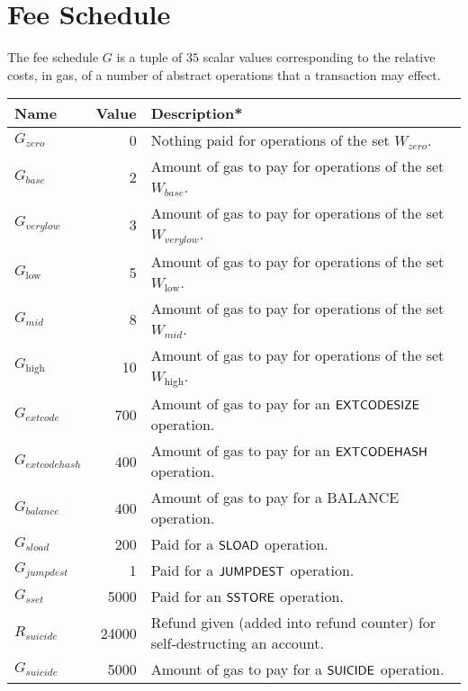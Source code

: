 

\section{Fee Schedule}\label{app:fees}

The fee schedule $G$ is a tuple of $35$ scalar values corresponding to the relative costs, in gas, of a number of abstract operations that a transaction may effect.

\begin{center}
	\begin{tabu}{l r l}
		\toprule
		Name & Value & Description* \\
		\midrule
		$G_{zero}$ & 0 & Nothing paid for operations of the set {\small $W_{zero}$}. \\
		$G_{base}$ & 2 & Amount of gas to pay for operations of the set {\small $W_{base}$}. \\
		$G_{verylow}$ & 3 & Amount of gas to pay for operations of the set {\small $W_{verylow}$}. \\
		$G_{\mathrm{low}}$ & 5 & Amount of gas to pay for operations of the set {\small $W_{\mathrm{low}}$}. \\
		$G_{mid}$ & 8 & Amount of gas to pay for operations of the set {\small $W_{mid}$}. \\
		$G_{\mathrm{high}}$ & 10 & Amount of gas to pay for operations of the set {\small $W_{\mathrm{high}}$}. \\
		$G_{extcode}$ & 700 & Amount of gas to pay for an $\mathsf{EXTCODESIZE}$ operation. \\
		$G_{extcodehash}$ & 400 & Amount of gas to pay for an $\mathsf{EXTCODEHASH}$ operation. \\
		$G_{balance}$ & 400 & Amount of gas to pay for a {\small BALANCE} operation. \\
		$G_{sload}$ & 200 & Paid for a $\mathsf{SLOAD}$ operation. \\
		$G_{jumpdest}$ & 1 & Paid for a $\mathsf{JUMPDEST}$ operation. \\
		$G_{sset}$ & 5000 & Paid for an $\mathsf{SSTORE}$ operation. \\
		$R_{suicide}$ & 24000 & Refund given (added into refund counter) for self-destructing an account. \\
		$G_{suicide}$ & 5000 & Amount of gas to pay for a $\mathsf{SUICIDE}$ operation. \\

\end{tabu}
\end{center}
